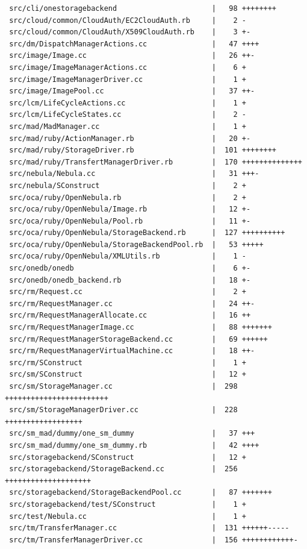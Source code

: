 \begin{lstlisting}
 src/cli/onestoragebackend                      |   98 ++++++++
 src/cloud/common/CloudAuth/EC2CloudAuth.rb     |    2 -
 src/cloud/common/CloudAuth/X509CloudAuth.rb    |    3 +-
 src/dm/DispatchManagerActions.cc               |   47 ++++
 src/image/Image.cc                             |   26 ++-
 src/image/ImageManagerActions.cc               |    6 +
 src/image/ImageManagerDriver.cc                |    1 +
 src/image/ImagePool.cc                         |   37 ++-
 src/lcm/LifeCycleActions.cc                    |    1 +
 src/lcm/LifeCycleStates.cc                     |    2 -
 src/mad/MadManager.cc                          |    1 +
 src/mad/ruby/ActionManager.rb                  |   20 +-
 src/mad/ruby/StorageDriver.rb                  |  101 ++++++++
 src/mad/ruby/TransfertManagerDriver.rb         |  170 ++++++++++++++
 src/nebula/Nebula.cc                           |   31 +++-
 src/nebula/SConstruct                          |    2 +
 src/oca/ruby/OpenNebula.rb                     |    2 +
 src/oca/ruby/OpenNebula/Image.rb               |   12 +-
 src/oca/ruby/OpenNebula/Pool.rb                |   11 +-
 src/oca/ruby/OpenNebula/StorageBackend.rb      |  127 ++++++++++
 src/oca/ruby/OpenNebula/StorageBackendPool.rb  |   53 +++++
 src/oca/ruby/OpenNebula/XMLUtils.rb            |    1 -
 src/onedb/onedb                                |    6 +-
 src/onedb/onedb_backend.rb                     |   18 +-
 src/rm/Request.cc                              |    2 +
 src/rm/RequestManager.cc                       |   24 ++-
 src/rm/RequestManagerAllocate.cc               |   16 ++
 src/rm/RequestManagerImage.cc                  |   88 +++++++
 src/rm/RequestManagerStorageBackend.cc         |   69 ++++++
 src/rm/RequestManagerVirtualMachine.cc         |   18 ++-
 src/rm/SConstruct                              |    1 +
 src/sm/SConstruct                              |   12 +
 src/sm/StorageManager.cc                       |  298 ++++++++++++++++++++++++
 src/sm/StorageManagerDriver.cc                 |  228 ++++++++++++++++++
 src/sm_mad/dummy/one_sm_dummy                  |   37 +++
 src/sm_mad/dummy/one_sm_dummy.rb               |   42 ++++
 src/storagebackend/SConstruct                  |   12 +
 src/storagebackend/StorageBackend.cc           |  256 ++++++++++++++++++++
 src/storagebackend/StorageBackendPool.cc       |   87 +++++++
 src/storagebackend/test/SConstruct             |    1 +
 src/test/Nebula.cc                             |    1 +
 src/tm/TransferManager.cc                      |  131 ++++++-----
 src/tm/TransferManagerDriver.cc                |  156 ++++++++++++-

\end{lstlisting}
